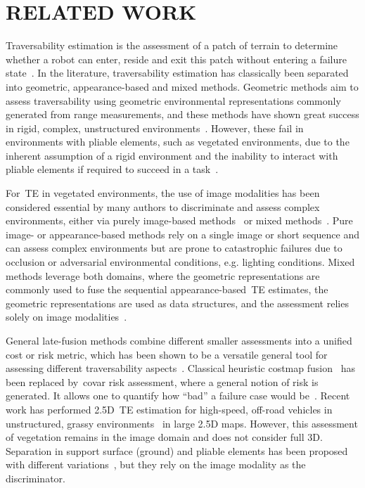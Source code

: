 \section{RELATED WORK}
\label{sec:related_work}

Traversability estimation is the assessment of a patch of terrain to determine whether a robot can enter, reside and exit this patch without entering a failure state~\cite{papadakis2013terrain}. In the literature, traversability estimation has classically been separated into geometric, appearance-based and mixed methods. Geometric methods aim to assess traversability using geometric environmental representations commonly generated from range measurements, and these methods have shown great success in rigid, complex, unstructured environments~\cite{HudTal21, tranzatto2022cerberus}. However, these fail in environments with pliable elements, such as vegetated environments, due to the inherent assumption of a rigid environment and the inability to interact with pliable elements if required to succeed in a task~\cite{frey2023fast}.  

For~\ac{TE} in vegetated environments, the use of image modalities has been considered essential by many authors to discriminate and assess complex environments, either via purely image-based methods~\cite{wellington2004online, frey2023fast} or mixed methods~\cite{frey2024roadrunner}. Pure image- or appearance-based methods rely on a single image or short sequence and can assess complex environments but are prone to catastrophic failures due to occlusion or adversarial environmental conditions, e.g. lighting conditions. Mixed methods leverage both domains, where the geometric representations are commonly used to fuse the sequential appearance-based~\ac{TE} estimates, the geometric representations are used as data structures, and the assessment relies solely on image modalities~\cite{frey2023fast, chen2023rspmp}.

General late-fusion methods combine different smaller assessments into a unified cost or risk metric, which has been shown to be a versatile general tool for assessing different traversability aspects~\cite{quigley2009ros, frey2024roadrunner, fan2021step}. Classical heuristic costmap fusion~\cite{quigley2009ros} has been replaced by~\ac{covar} risk assessment, where a general notion of risk is generated. It allows one to quantify how ``bad'' a failure case would be~\cite{fan2021step}. Recent work has performed 2.5D~\ac{TE} estimation for high-speed, off-road vehicles in unstructured, grassy environments~\cite{frey2024roadrunner} in large 2.5D maps. However, this assessment of vegetation remains in the image domain and does not consider full 3D. Separation in support surface (ground) and pliable elements has been proposed with different variations~\cite{wellington2004online, bradley2015scene, li2023seeing}, but they rely on the image modality as the discriminator.

